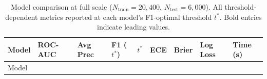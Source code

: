 \documentclass[
  letterpaper,
  DIV=11,
  numbers=noendperiod]{scrartcl}
\begin{document}
\begin{longtable}[]{@{}
  >{\raggedright\arraybackslash}p{}
  >{\centering\arraybackslash}p{}
  >{\centering\arraybackslash}p{}
  >{\centering\arraybackslash}p{}
  >{\centering\arraybackslash}p{}
  >{\centering\arraybackslash}p{}
  >{\centering\arraybackslash}p{}
  >{\centering\arraybackslash}p{}
  >{\centering\arraybackslash}p{}@{}}
\caption{Model comparison at full scale
(\(N_{\text{train}} = 20{,}400\), \(N_{\text{test}} = 6{,}000\)). All
threshold-dependent metrics reported at each model's F1-optimal
threshold \(t^*\). Bold entries indicate leading
values.}\label{tbl-uci-large}\tabularnewline
\toprule\noalign{}
\begin{minipage}[b]{\linewidth}\raggedright
Model
\end{minipage} & \begin{minipage}[b]{\linewidth}\centering
ROC-AUC
\end{minipage} & \begin{minipage}[b]{\linewidth}\centering
Avg Prec
\end{minipage} & \begin{minipage}[b]{\linewidth}\centering
F1 (\(t^*\))
\end{minipage} & \begin{minipage}[b]{\linewidth}\centering
\(t^*\)
\end{minipage} & \begin{minipage}[b]{\linewidth}\centering
ECE
\end{minipage} & \begin{minipage}[b]{\linewidth}\centering
Brier
\end{minipage} & \begin{minipage}[b]{\linewidth}\centering
Log Loss
\end{minipage} & \begin{minipage}[b]{\linewidth}\centering
Time (s)
\end{minipage} \\
\midrule\noalign{}
\endfirsthead
\toprule\noalign{}
\begin{minipage}[b]{\linewidth}\raggedright
Model
\end{minipage} & \begin{minipage}[b]{\linewidth}\centering

\end{minipage}
\end{longtable}
\end{document}
